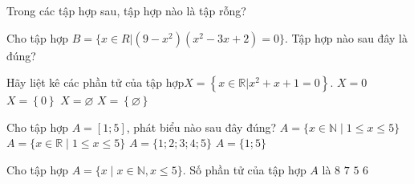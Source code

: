 

\begin{ex}%
	Trong các tập hợp  sau, tập hợp nào là tập rỗng?
\end{ex}

\begin{ex}%
	Cho tập hợp $B=\{x\in  R|(9-x^{2})(x^{2}-3x+2)=0\}$. Tập hợp nào sau đây là đúng?
\end{ex}

\begin{ex}%
	Hãy liệt kê các phần tử của tập  hợp$X=\left\{x\in \mathbb{R}\big|x^2+x+1=0\right\}$.
	\choice 
		{$X=0$} 
		 {$X=\left\{0\right\}$}
		{\True  $X=\varnothing $}
		 {$X=\left\{\varnothing\right\}$}
\end{ex}

\begin{ex}%
	Cho tập hợp $A=[1;5]$, phát biểu nào sau đây đúng? 
	 \choice
		{$A=\{x\in\mathbb{N}\mid  1\le x\le 5\}$}
		{\True$A=\{x\in \mathbb{R}\mid 1\le x\le 5\}$} 
		 {$A=\{1;2;3;4;5\}$}
		{$A=\{1;5\}$} 
\end{ex}

\begin{ex}%
	 Cho tập hợp $A=\{x \mid x \in \mathbb{N}, x \leq 5\}$. Số phần tử của tập hợp $A$ là
	 \choice
		{$8$} 
		 {$7$}
		{$5$} 
		{\True  $6$}
\end{ex}

